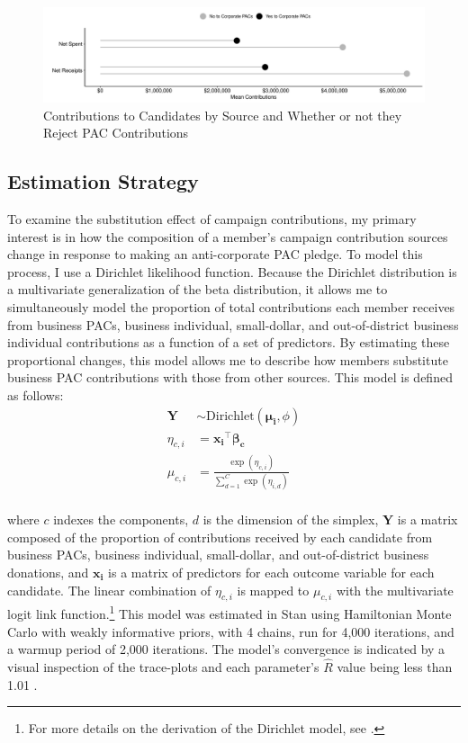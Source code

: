 \documentclass[12pt]{article}
\begin{document}
\begin{figure}[!ht]
    \centering
    \includegraphics[width=0.9\linewidth]{spending_candy.pdf}
    \caption{Contributions to Candidates by Source and Whether or not they Reject PAC Contributions}
    \label{fig: total money}
\end{figure}

\subsection{Estimation Strategy}

To examine the substitution effect of campaign contributions, my primary interest is in how the composition of a member's campaign contribution sources change in response to making an anti-corporate PAC pledge. To model this process, I use a Dirichlet likelihood function. Because the Dirichlet distribution is a multivariate generalization of the beta distribution, it allows me to simultaneously model the proportion of total contributions each member receives from business PACs, business individual, small-dollar, and out-of-district business individual contributions as a function of a set of predictors. By estimating these proportional changes, this model allows me to describe how members substitute business PAC contributions with those from other sources. This model is defined as follows: 
$$
\begin{aligned}
\bm{Y} &\sim \text{Dirichlet}(\bm{\mu_i}, \phi) \\
\eta_{c,i} &= \bm{x_i}^\top \bm{\beta_c} \\
\mu_{c,i} &= \frac{\exp(\eta_{c,i})}{\sum^{C}_{d=1}\exp(\eta_{i,d})} \\
\end{aligned}
$$

\noindent where $c$ indexes the components, $d$ is the dimension of the simplex, $\bm{Y}$ is a matrix composed of the proportion of contributions received by each candidate from business PACs, business individual, small-dollar, and out-of-district business donations, and $\bm{x_i}$ is a matrix of predictors for each outcome variable for each candidate. The linear combination of $\eta_{c,i}$ is mapped to $\mu_{c,i}$ with the multivariate logit link function.\footnote{For more details on the derivation of the Dirichlet model, see \citet{hijazi2009}.} This model was estimated in Stan using Hamiltonian Monte Carlo with weakly informative priors, with 4 chains, run for 4,000 iterations, and a warmup period of 2,000 iterations. The model's convergence is indicated by a visual inspection of the trace-plots and each parameter's $\hat{R}$ value being less than 1.01 \citep{standevelopmentteam2021, burkner2017a}. 
\end{document}
